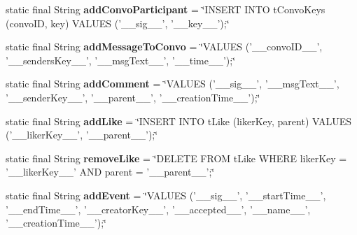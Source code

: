 \begin{DoxyCompactItemize}
\item 
\hypertarget{classballmerpeak_1_1turtlenet_1_1server_1_1DBStrings_a2ef3257d6674eeb1d1eb0db4427eee3f}{static final String {\bfseries add\-Convo\-Participant} = \char`\"{}I\-N\-S\-E\-R\-T I\-N\-T\-O t\-Convo\-Keys (convo\-I\-D, key) V\-A\-L\-U\-E\-S ('\-\_\-\-\_\-sig\-\_\-\-\_\-', '\-\_\-\-\_\-key\-\_\-\-\_\-');\char`\"{}}\label{classballmerpeak_1_1turtlenet_1_1server_1_1DBStrings_a2ef3257d6674eeb1d1eb0db4427eee3f}

\item 
\hypertarget{classballmerpeak_1_1turtlenet_1_1server_1_1DBStrings_a45dac2349c3f3f754513df6f87cc3b50}{static final String {\bfseries add\-Message\-To\-Convo} = \char`\"{}V\-A\-L\-U\-E\-S ('\-\_\-\-\_\-convo\-I\-D\-\_\-\-\_\-', '\-\_\-\-\_\-senders\-Key\-\_\-\-\_\-', '\-\_\-\-\_\-msg\-Text\-\_\-\-\_\-', '\-\_\-\-\_\-time\-\_\-\-\_\-');\char`\"{}}\label{classballmerpeak_1_1turtlenet_1_1server_1_1DBStrings_a45dac2349c3f3f754513df6f87cc3b50}

\item 
\hypertarget{classballmerpeak_1_1turtlenet_1_1server_1_1DBStrings_a87d52ca49fb4861212ad5e9319ca8707}{static final String {\bfseries add\-Comment} = \char`\"{}V\-A\-L\-U\-E\-S ('\-\_\-\-\_\-sig\-\_\-\-\_\-', '\-\_\-\-\_\-msg\-Text\-\_\-\-\_\-', '\-\_\-\-\_\-sender\-Key\-\_\-\-\_\-', '\-\_\-\-\_\-parent\-\_\-\-\_\-', '\-\_\-\-\_\-creation\-Time\-\_\-\-\_\-');\char`\"{}}\label{classballmerpeak_1_1turtlenet_1_1server_1_1DBStrings_a87d52ca49fb4861212ad5e9319ca8707}

\item 
\hypertarget{classballmerpeak_1_1turtlenet_1_1server_1_1DBStrings_a2a78b8bf2571d76c753619719f6f5aac}{static final String {\bfseries add\-Like} = \char`\"{}I\-N\-S\-E\-R\-T I\-N\-T\-O t\-Like (liker\-Key, parent) V\-A\-L\-U\-E\-S ('\-\_\-\-\_\-liker\-Key\-\_\-\-\_\-', '\-\_\-\-\_\-parent\-\_\-\-\_\-');\char`\"{}}\label{classballmerpeak_1_1turtlenet_1_1server_1_1DBStrings_a2a78b8bf2571d76c753619719f6f5aac}

\item 
\hypertarget{classballmerpeak_1_1turtlenet_1_1server_1_1DBStrings_a17b087b58c02d5e260242f71add2c9ca}{static final String {\bfseries remove\-Like} = \char`\"{}D\-E\-L\-E\-T\-E F\-R\-O\-M t\-Like W\-H\-E\-R\-E liker\-Key = '\-\_\-\-\_\-liker\-Key\-\_\-\-\_\-' A\-N\-D parent = '\-\_\-\-\_\-parent\-\_\-\-\_\-';\char`\"{}}\label{classballmerpeak_1_1turtlenet_1_1server_1_1DBStrings_a17b087b58c02d5e260242f71add2c9ca}

\item 
\hypertarget{classballmerpeak_1_1turtlenet_1_1server_1_1DBStrings_a179f2c1d92f556d4fa74acf16cf13f7a}{static final String {\bfseries add\-Event} = \char`\"{}V\-A\-L\-U\-E\-S ('\-\_\-\-\_\-sig\-\_\-\-\_\-', '\-\_\-\-\_\-start\-Time\-\_\-\-\_\-', '\-\_\-\-\_\-end\-Time\-\_\-\-\_\-', '\-\_\-\-\_\-creator\-Key\-\_\-\-\_\-', '\-\_\-\-\_\-accepted\-\_\-\-\_\-', '\-\_\-\-\_\-name\-\_\-\-\_\-', '\-\_\-\-\_\-creation\-Time\-\_\-\-\_\-');\char`\"{}}\label{classballmerpeak_1_1turtlenet_1_1server_1_1DBStrings_a179f2c1d92f556d4fa74acf16cf13f7a}


\end{DoxyCompactItemize}
